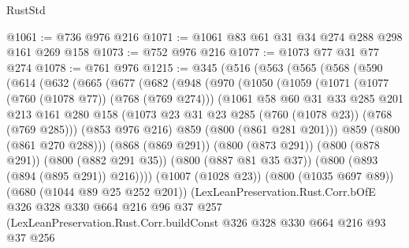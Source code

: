 \begin{lexlean}{RustStd}
\begin{coremodule}
{\begin{coremodule}
{{{{{@1061 := @736 @976 @216
@1071 := @1061 @83 @61 @31 @34 @274 @288 @298 @161 @269 @158
@1073 := @752 @976 @216
@1077 := @1073 @77 @31 @77 @274
@1078 := @761 @976
@1215 := @345
    (@516
      (@563
        (@565
          (@568
            (@590
              (@614
                (@632
                  (@665
                    (@677
                      (@682
                        (@948
                          (@970
                            (@1050
                              (@1059
                                (@1071
                                  (@1077 (@760 (@1078 @77)) (@768 (@769 @274)))
                                  (@1061
                                    @58
                                    @60
                                    @31
                                    @33
                                    @285
                                    @201
                                    @213
                                    @161
                                    @280
                                    @158
                                    (@1073 @23 @31 @23 @285 (@760 (@1078 @23)) (@768 (@769 @285)))
                                    (@853 @976 @216)
                                    @859
                                    (@800 (@861 @281 @201)))
                                  @859
                                  (@800 (@861 @270 @288)))
                                (@868 (@869 @291))
                                (@800 (@873 @291))
                                (@800 (@878 @291))
                                (@800 (@882 @291 @35))
                                (@800 (@887 @81 @35 @37))
                                (@800 (@893 (@894 (@895 @291)) @216))))
                            (@1007 (@1028 @23))
                            (@800 (@1035 @697 @89))
                            (@680 (@1044 @89 @25 @252 @201))
                            (LexLeanPreservation.Rust.Corr.bOfE
                              @326
                              @328
                              @330
                              @664
                              @216
                              @96
                              @37
                              @257
                              (LexLeanPreservation.Rust.Corr.buildConst
                                @326
                                @328
                                @330
                                @664
                                @216
                                @93
                                @37
                                @256
}}}}}
\end{coremodule}}
\end{coremodule}
\end{lexlean}
